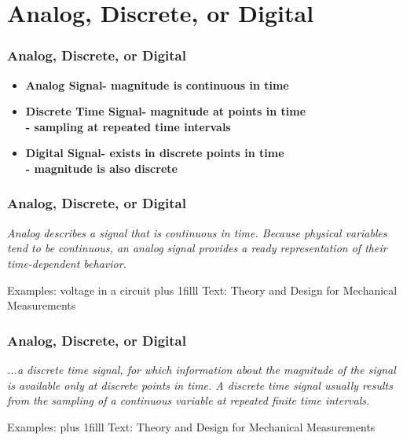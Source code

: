 \documentclass[fleqn]{beamer} %
\newcommand{\sectiontitleII}{Analog, Discrete, or Digital}
\newcommand{\btVFill}{\vskip0pt plus 1filll}
\begin{document}
\section{\sectiontitleII}	
	\begin{frame}[label=sectionII] \small
		\frametitle{\sectiontitleII}
		

	    \begin{itemize}
			\item \textbf{Analog Signal- magnitude is continuous in time }  \vspace{3mm} \\
			\item \textbf{Discrete Time Signal- magnitude at points in time}  \vspace{3mm} \\
			\textbf{ \hspace*{15mm} - sampling at repeated time intervals}  \vspace{3mm} \\
			\item \textbf{Digital Signal- exists in discrete points in time}  \vspace{3mm} \\
			\textbf{ \hspace*{15mm} - magnitude is also discrete}  \vspace{3mm} \\
		\end{itemize}
		
		
	\end{frame}

	\begin{frame} \small
		\frametitle{\sectiontitleII}
		\bigskip    
		
		{\it {\RD Analog} describes a signal that is
		continuous in time. Because physical variables tend to be continuous, an analog signal provides a
		ready representation of their time-dependent behavior. }

		\vspace{30mm}
		Examples: voltage in a circuit
		\btVFill
		\tiny{Text: Theory and Design for Mechanical Measurements}	
	\end{frame}
	
	\begin{frame} \small
		\frametitle{\sectiontitleII}    
		\bigskip  
			
		{\it ...a {\GR discrete time} signal, for which information about the
		magnitude of the signal is available only at discrete points in time. A discrete time signal usually
		results from the sampling of a continuous variable at repeated finite time intervals. }

		\vspace{30mm}
		Examples:
		\btVFill
		\tiny{Text: Theory and Design for Mechanical Measurements}	
	\end{frame}
	
\end{document}
